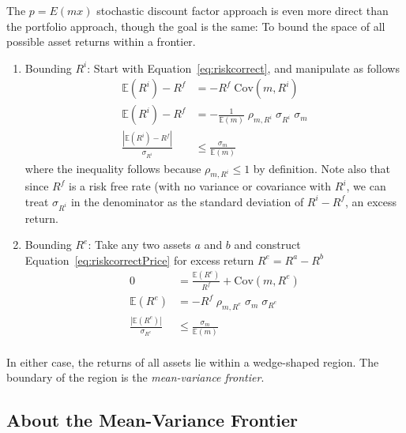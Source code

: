 \documentclass[a4paper,12pt]{scrartcl}
\begin{document}
The $p=E(mx)$ stochastic discount factor approach is even more direct
than the portfolio approach, though the goal is the same: To bound the
space of all possible asset returns within a frontier.
\begin{enumerate}
  \item Bounding $R^i$: Start with Equation~\ref{eq:riskcorrect}, and
    manipulate as follows
    \begin{align*}
      \mathbb{E}(R^i) - R^f
      &= -R^f \; \text{Cov}(m,R^i)\\
      \mathbb{E}(R^i) - R^f
      &= -\frac{1}{\mathbb{E}(m)} \; \rho_{m,R^i} \; \sigma_{R^i} \; \sigma_m\\
      \frac{\left\lvert\mathbb{E}(R^i) - R^f\right\rvert}{\sigma_{R^i}}
      &\leq \frac{\sigma_m}{\mathbb{E}(m)}
    \end{align*}
    where the inequality follows because $\rho_{m,R^i}\leq 1$ by definition.
    Note also that since $R^f$ is a risk free rate (with no variance or
    covariance with $R^i$, we can treat $\sigma_{R^i}$ in the denominator as
    the standard deviation of $R^i-R^f$, an excess return.

  \item Bounding $R^e$: Take any two assets $a$ and $b$ and construct
    Equation~\ref{eq:riskcorrectPrice} for excess return $R^e=R^a-R^b$
    \begin{align*}
      0 &= \frac{\mathbb{E}(R^e)}{R^f} + \text{Cov}(m,R^e)\\
      \mathbb{E}(R^e)
      &= -R^f \; \rho_{m,R^e} \; \sigma_m \; \sigma_{R^e}\\
      \frac{\left\lvert\mathbb{E}(R^e)\right\rvert}{\sigma_{R^e}}
      &\leq \frac{\sigma_m}{\mathbb{E}(m)} \\
    \end{align*}
\end{enumerate}
In either case, the returns of all assets lie within a wedge-shaped
region. The boundary of the region is the \emph{mean-variance frontier}.

\subsection{About the Mean-Variance Frontier}
\end{document}
